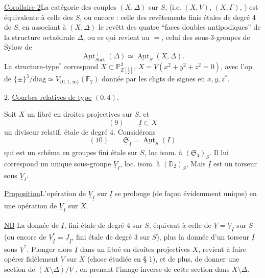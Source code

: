\uline{Corollaire 2}\quad La catégorie des couples $(X,\Delta)$  sur $S$, (i.e. $(X,\underline V)$,  $(X,\underline\Gamma)$, ) est équivalente à celle des  $S$, ou encore : celle des revêtements finis étales \deleted{$\unsure{\Delta}$}  de degré $4$ de $S$, en associant à  $(X,\Delta)$ le revêtt des quatre ``faces doubles antipodiques'' de la structure octaédrale $\Delta$, ou ce qui revient au $=$, celui des sous-$3$-groupes de Sylow de 
\[
\underline{\operatorname{Aut}}^+_{S\mathrm{oct}}(\Delta)\simeq\underline{\operatorname{Aut}}_S(X,\Delta).
\]
La structure-type${}^*$ correspond  $X\subset\mathbb P^2_{\mathbb Z[\frac12]}$, $X=V(x^2+y^2+z^2=0)$, avec l'op. de  $\{\pm\}^3/\mathrm{diag}\simeq V_{\{0,1,\infty\}}(\mathbb F_2)$ donnée par les chgts de signes en $x,y,z$${}^*$.

2. \uline{Courbes relatives de type} $(0,4)$.

Soit $X$ un fibré en droites projectives sur $S$, et
\[
(9)\qquad\underline I\subset X
\]
un diviseur relatif, étale de degré $4$. Considérons
\[
(10)\qquad\underline{\mathfrak S}_{\underline I}=\underline{\operatorname{Aut}}_S(I)
\]
qui est un schéma en groupes fini étale sur $S$, loc isom. à $(\mathfrak S_4)_S$. Il lui correspond un unique sous-groupe  $\underline V_{\underline I}$, loc. isom. à $(\mathbb D_2)_S$,  Mais $\underline I$ est un torseur sous $\underline V_I$.

\uline{Proposition}\quad L'opération de $\underline V_{\underline I}$ sur $\underline I$ se prolonge (de façon évidemment unique) en une opération de $\underline V_{\underline I}$ sur $X$.

\uline{NB} La donnée de $\underline I$, fini étale de degré $4$ sur $S$, équivaut à celle de $\underline V=\underline V_{\underline I}$ sur $S$ (ou encore de $\underline V_{\underline I}^*=\underline J_{\underline I}$, fini étale de degré $3$ sur $S$), plus la donnée d'un torseur $\underline I$ sous $\underline V^*$. Plonger alors $\underline I$ dans un fibré en droites projectives $X$, revient à faire opérer fidèlement $\underline V$ sur $X$ (chose étudiée en § 1), et de plus, de 
donner une section de $(X\setminus\Delta)/\underline V$ , en prenant  l'image inverse de cette section dans $X\setminus\Delta$.

